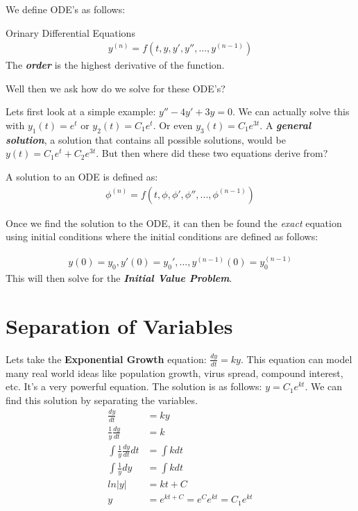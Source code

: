 We define ODE's as follows:
\begin{definition}{Orinary Differential Equations}{}
    \begin{align*}
        y^{(n)} = f(t, y, y', y'', ..., y^{(n-1)})
    \end{align*}
    The \textbf{\emph{order}} is the highest derivative of the function.
\end{definition}

Well then we ask how do we solve for these ODE's?

\begin{example}{}{}
    Lets first look at a simple example: $y''-4y'+3y=0$. We can actually solve this with $y_1(t) = e^t$ or $y_2(t) = C_1e^t$. Or even $y_3(t) = C_1e^{3t}$. A \textbf{\emph{general solution}}, a solution that contains all possible solutions, would be $y(t)=C_1e^t + C_2e^{3t}$. But then where did these two equations derive from? 
\end{example}

\begin{definition}{}{}
    A solution to an ODE is defined as:
    \begin{align*}
        \phi^{(n)} = f(t, \phi, \phi', \phi'', ..., \phi^{(n-1)})
    \end{align*}
\end{definition}

Once we find the solution to the ODE, it can then be found the \emph{exact} equation using initial conditions where the initial conditions are defined as follows:
\begin{definition}{}{}
    \begin{align*}
        y(0) = y_0, y'(0) = y_0', ..., y^{(n-1)}(0) = y_0^{(n-1)}
    \end{align*}
    This will then solve for the \textbf{\emph{Initial Value Problem}}.
\end{definition}

\section{Separation of Variables}

Lets take the \textbf{Exponential Growth} equation: $\frac{dy}{dt} = ky$. This equation can model many real world ideas like population growth, virus spread, compound interest, etc. It's a very powerful equation. The solution is as follows: $y=C_1e^{kt}$. We can find this solution by separating the variables.
\begin{align*}
    \frac{dy}{dt} & = ky \\
    \frac{1}{y} \frac{dy}{dt} & = k \\
    \int \frac{1}{y} \frac{dy}{dt} dt & = \int k dt \\
    \int \frac{1}{y} dy & = \int k dt \\
    ln|y| & = kt + C \\
    y & = e^{kt + C} = e^{C}e^{kt} = C_1e^{kt} \\
\end{align*}


